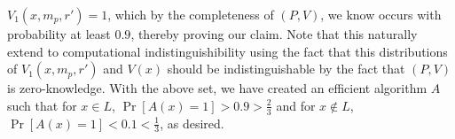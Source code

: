\documentclass{article}
\begin{document}
\begin{enumerate}[,start=3]
\begin{mdbmarginx}{1ex}{0pt}{1ex}{0pt}
$V_1(x,m_p,r') = 1$, which by the completeness of $(P,V)$, we know occurs with probability at least
$0.9$, thereby proving our claim. Note that this naturally extend to computational indistinguishibility
using the fact that this distributions of $V_1(x,m_p,r')$ and $V(x)$ should be indistinguishable
by the fact that $(P,V)$ is zero-knowledge. With the above set, we have created an efficient 
algorithm $A$ such that for $x \in L$, $\Pr[A(x) = 1] > 0.9 > \frac{2}{3}$ and for $x \notin L$,
$\Pr[A(x) = 1] < 0.1 < \frac{1}{3}$, as desired.%
\end{mdbmarginx}%
\end{enumerate}%
\end{document}
